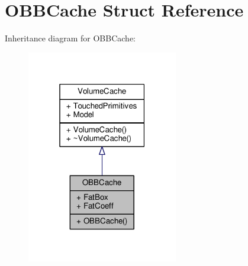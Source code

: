 \hypertarget{structOBBCache}{}\section{O\+B\+B\+Cache Struct Reference}
\label{structOBBCache}


Inheritance diagram for O\+B\+B\+Cache\+:
\nopagebreak
\begin{figure}[H]
\begin{center}
\leavevmode
\includegraphics[width=187pt]{de/da5/structOBBCache__inherit__graph}
\end{center}
\end{figure}


